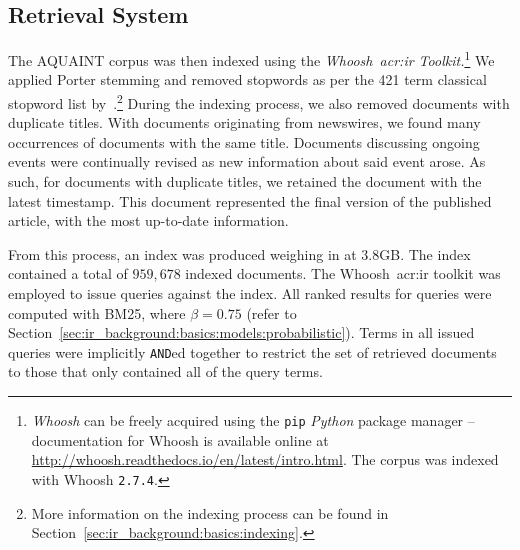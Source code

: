 \begin{figure}[h]
    \centering
    \vspace{6mm}
    \vspace{-9mm}
    \label{fig:aquaint_stats}
\end{figure}

\subsection{Retrieval System}\label{sec:methodology:collection:system}
The AQUAINT corpus was then indexed using the \emph{Whoosh~\gls{acr:ir} Toolkit.}\footnote{\emph{Whoosh} can be freely acquired using the \texttt{pip} \emph{Python} package manager -- documentation for Whoosh is available online at \url{http://whoosh.readthedocs.io/en/latest/intro.html}.  The corpus was indexed with Whoosh \texttt{2.7.4}.} We applied Porter stemming and removed stopwords as per the 421 term classical stopword list by~\cite{fox1992stopwords}.\footnote{More information on the indexing process can be found in Section~\ref{sec:ir_background:basics:indexing}.} During the indexing process, we also removed documents with duplicate titles. With documents originating from newswires, we found many occurrences of documents with the same title. Documents discussing ongoing events were continually revised as new information about said event arose. As such, for documents with duplicate titles, we retained the document with the latest timestamp. This document represented the final version of the published article, with the most up-to-date information.

From this process, an index was produced weighing in at $3.8$GB. The index contained a total of $959,678$ indexed documents. The Whoosh~\gls{acr:ir} toolkit was employed to issue queries against the index. All ranked results for queries were computed with BM25, where $\beta=0.75$ (refer to Section~\ref{sec:ir_background:basics:models:probabilistic}). Terms in all issued queries were implicitly \texttt{AND}ed together to restrict the set of retrieved documents to those that only contained all of the query terms.

